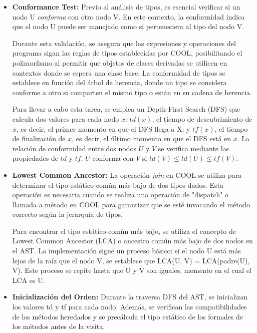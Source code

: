 \documentclass[10pt]{article} %
\begin{document}
	\vspace{0.5em}
	\begin{itemize}
	\item \textbf{Conformance Test:} Previo al análisis de tipos, es esencial verificar si un nodo U \textit{conforma} con otro nodo V. En este contexto, la conformidad indica que el nodo U puede ser manejado como si perteneciera al tipo del nodo V.
	
	Durante esta validación, se asegura que las expresiones y operaciones del programa sigan las reglas de tipos establecidas por COOL, posibilitando el polimorfismo al permitir que objetos de clases derivadas se utilicen en contextos donde se espera una clase base. La conformidad de tipos se establece en función del árbol de herencia, donde un tipo se considera conforme a otro si comparten el mismo tipo o están en su cadena de herencia. 
	
	Para llevar a cabo esta tarea, se emplea un Depth-First Search (DFS) que calcula dos valores para cada nodo $x$: $td(x)$, el tiempo de descubrimiento de $x$, es decir, el primer momento en que el DFS llega a X; y $tf(x)$, el tiempo de finalización de $x$, es decir, el último momento en que el DFS está en $x$. La relación de conformidad entre dos nodos $U$ y $V$ se verifica mediante las propiedades de $td$ y $tf$. $U$ conforma con $V$ si $td(V) \leq td(U) \leq tf(V)$.
	
	\item \textbf{Lowest Common Ancestor:} La operación \textit{join} en COOL se utiliza para determinar el tipo estático común más bajo de dos tipos dados. Esta operación es necesaria cuando se realiza una operación de "dispatch" o llamada a método en COOL para garantizar que se esté invocando el método correcto según la jerarquía de tipos.
	
	Para encontrar el tipo estático común más bajo, se utiliza el concepto de Lowest Common Ancestor (LCA) o ancestro común más bajo de dos nodos en el AST. La implementación sigue un proceso básico: si el nodo U está más lejos de la raíz que el nodo V, se establece que LCA(U, V) = LCA(padre(U), V). Este proceso se repite hasta que U y V son iguales, momento en el cual el LCA es U. 
	
	\item \textbf{Inicialización del Orden:}
	Durante la traversa DFS del AST, se inicializan los valores td y tf para cada nodo. Además, se verifican las compatibilidades de los métodos heredados y se precálcula el tipo estático de los formales de los métodos antes de la visita.


\end{itemize}
\end{document}
